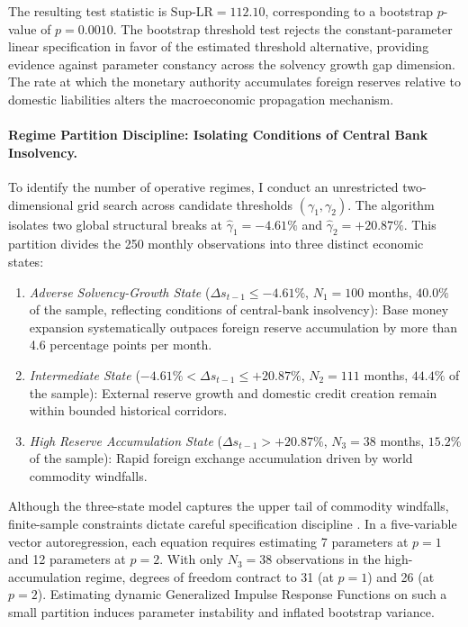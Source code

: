 The resulting test statistic is $\text{Sup-LR} = 112.10$, corresponding to a bootstrap $p$-value of $p = 0.0010$. The bootstrap threshold test rejects the constant-parameter linear specification in favor of the estimated threshold alternative, providing evidence against parameter constancy across the solvency growth gap dimension. The rate at which the monetary authority accumulates foreign reserves relative to domestic liabilities alters the macroeconomic propagation mechanism.

\paragraph{Regime Partition Discipline: Isolating Conditions of Central Bank Insolvency.}
To identify the number of operative regimes, I conduct an unrestricted two-dimensional grid search across candidate thresholds $(\gamma_1, \gamma_2)$. The algorithm isolates two global structural breaks at $\hat{\gamma}_1 = -4.61\%$ and $\hat{\gamma}_2 = +20.87\%$. This partition divides the 250 monthly observations into three distinct economic states:
\begin{enumerate}[leftmargin=*,itemsep=1pt]
    \item \emph{Adverse Solvency-Growth State} ($\Delta s_{t-1} \le -4.61\%$, $N_1 = 100$ months, $40.0\%$ of the sample, reflecting conditions of central-bank insolvency): Base money expansion systematically outpaces foreign reserve accumulation by more than 4.6 percentage points per month.
    \item \emph{Intermediate State} ($-4.61\% < \Delta s_{t-1} \le +20.87\%$, $N_2 = 111$ months, $44.4\%$ of the sample): External reserve growth and domestic credit creation remain within bounded historical corridors.
    \item \emph{High Reserve Accumulation State} ($\Delta s_{t-1} > +20.87\%$, $N_3 = 38$ months, $15.2\%$ of the sample): Rapid foreign exchange accumulation driven by world commodity windfalls.
\end{enumerate}

Although the three-state model captures the upper tail of commodity windfalls, finite-sample constraints dictate careful specification discipline \citep{Hansen1999,Afonso2018}. In a five-variable vector autoregression, each equation requires estimating 7 parameters at $p=1$ and 12 parameters at $p=2$. With only $N_3 = 38$ observations in the high-accumulation regime, degrees of freedom contract to 31 (at $p=1$) and 26 (at $p=2$). Estimating dynamic Generalized Impulse Response Functions on such a small partition induces parameter instability and inflated bootstrap variance.


